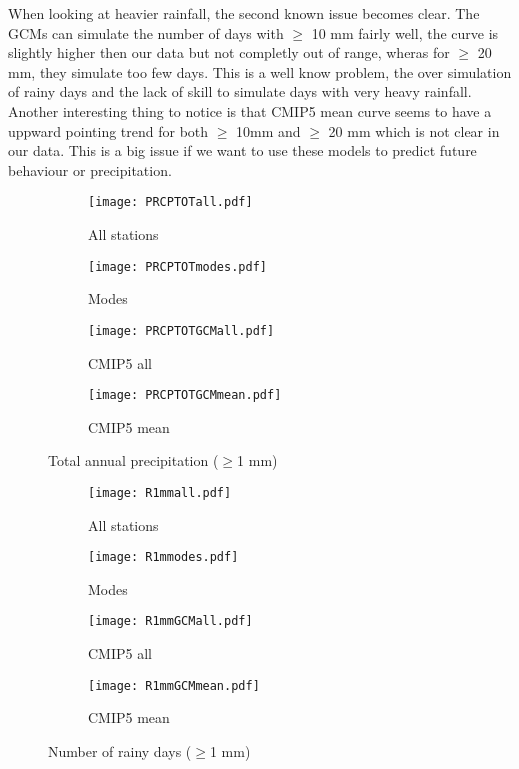 \documentclass{article}
\begin{document}
	When looking at heavier rainfall, the second known issue becomes clear. The GCMs can simulate the number of days with $\geq$ 10 mm fairly well, the curve is slightly higher then our data but not completly out of range, wheras for $\geq$ 20 mm, they simulate too few days. This is a well know problem, the over simulation of rainy days and the lack of skill to simulate days with very heavy rainfall. Another interesting thing to notice is that CMIP5 mean curve seems to have a uppward pointing trend for both $\geq$ 10mm and $\geq$ 20 mm which is not clear in our data. This is a big issue if we want to use these models to predict future behaviour or precipitation. 
	
	\begin{figure}[H]
		\centering
		\begin{subfigure}{0.5\textwidth}
			\centering
			\texttt{[image: PRCPTOTall.pdf]}
			\caption{All stations}
		\end{subfigure}%
		\begin{subfigure}{0.5\textwidth}
			\centering
			\texttt{[image: PRCPTOTmodes.pdf]}
			\caption{Modes}
		\end{subfigure}
		\begin{subfigure}{0.5\textwidth}
		\centering
		\texttt{[image: PRCPTOTGCMall.pdf]}
		\caption{CMIP5 all}
	\end{subfigure}%
	\begin{subfigure}{0.5\textwidth}
		\centering
		\texttt{[image: PRCPTOTGCMmean.pdf]}
		\caption{CMIP5 mean}
	\end{subfigure}
		\caption{Total annual precipitation ($\geq$1 mm)}
		\label{PRCPTOT}
	\end{figure}

	\begin{figure}[H]
		\centering
		\begin{subfigure}{0.5\textwidth}
			\centering
			\texttt{[image: R1mmall.pdf]}
			\caption{All stations}
		\end{subfigure}%
		\begin{subfigure}{0.5\textwidth}
			\centering
			\texttt{[image: R1mmodes.pdf]}
			\caption{Modes}
		\end{subfigure}
		\begin{subfigure}{0.5\textwidth}
			\centering
			\texttt{[image: R1mmGCMall.pdf]}
			\caption{CMIP5 all}
		\end{subfigure}%
		\begin{subfigure}{0.5\textwidth}
			\centering
			\texttt{[image: R1mmGCMmean.pdf]}
			\caption{CMIP5 mean}
		\end{subfigure}
		\caption{Number of rainy days ($\geq$1 mm)}
		\label{R1mm}
	\end{figure}
	
\end{document}
